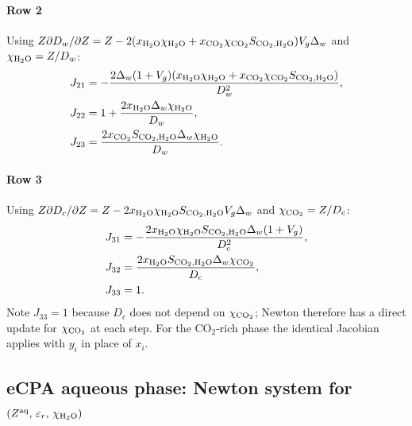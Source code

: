 \documentclass[preprint,12pt,number]{elsarticle}
\begin{document}
\paragraph{Row 2}
Using $Z\partial D_w/\partial Z = Z - 2(x_{\rm H_2O}\chi_{\rm H_2O} + x_{\rm CO_2}\chi_{\rm CO_2} S_{{\rm CO_2},{\rm H_2O}})V_g\Delta_w$
and $\chi_{\rm H_2O} = Z/D_w$:
\begin{align}
  J_{21} &= -\frac{2\Delta_w(1+V_g)(x_{\rm H_2O}\chi_{\rm H_2O} + x_{\rm CO_2}\chi_{\rm CO_2} S_{{\rm CO_2},{\rm H_2O}})}{D_w^2},
             \label{eq:J21} \\
  J_{22} &= 1 + \frac{2x_{\rm H_2O}\Delta_w\chi_{\rm H_2O}}{D_w}, \label{eq:J22} \\
  J_{23} &= \frac{2x_{\rm CO_2} S_{{\rm CO_2},{\rm H_2O}}\Delta_w\chi_{\rm H_2O}}{D_w}. \label{eq:J23}
\end{align}

\paragraph{Row 3}
Using $Z\partial D_c/\partial Z = Z - 2x_{\rm H_2O}\chi_{\rm H_2O} S_{{\rm CO_2},{\rm H_2O}} V_g\Delta_w$
and $\chi_{\rm CO_2} = Z/D_c$:
\begin{align}
  J_{31} &= -\frac{2x_{\rm H_2O}\chi_{\rm H_2O} S_{{\rm CO_2},{\rm H_2O}}\Delta_w(1+V_g)}{D_c^2},
             \label{eq:J31} \\
  J_{32} &= \frac{2x_{\rm H_2O} S_{{\rm CO_2},{\rm H_2O}}\Delta_w\chi_{\rm CO_2}}{D_c}, \label{eq:J32} \\
  J_{33} &= 1. \label{eq:J33}
\end{align}
Note $J_{33}=1$ because $D_c$ does not depend on $\chi_{\rm CO_2}$; Newton therefore
has a direct update for $\chi_{\rm CO_2}$ at each step.
For the CO$_2$-rich phase the identical Jacobian applies with $y_i$ in place of $x_i$.

\subsection{eCPA aqueous phase: Newton system for $(Z^{\rm aq},\,\varepsilon_r,\,\chi_{\rm H_2O})$}
\label{sec:jac_ecpa}
\end{document}
